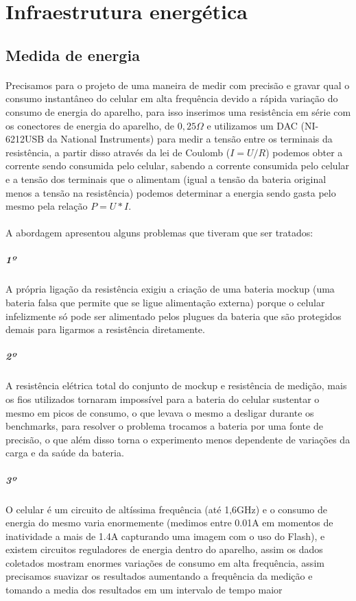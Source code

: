 \documentclass[11pt,a4paper,titlepage]{article}
\begin{document}
\section{Infraestrutura energética}
\subsection{Medida de energia} 
\paragraph{} Precisamos para o projeto de uma maneira de medir com precisão e gravar qual o consumo instantâneo do celular em alta frequência devido a rápida variação do consumo de energia do aparelho, para isso inserimos uma resistência em série com os conectores de energia do aparelho, de $0,25\Omega$ e utilizamos um DAC (NI-6212USB da National Instruments) para medir a tensão entre os terminais da resistência, a partir disso através da lei de Coulomb ($I=U/R$) podemos obter a corrente sendo consumida pelo celular, sabendo a corrente consumida pelo celular e a tensão dos terminais que o alimentam (igual a tensão da bateria original menos a tensão na resistência) podemos determinar a energia sendo gasta pelo mesmo pela relação $P=U*I$.
\paragraph{} A abordagem apresentou alguns problemas que tiveram que ser tratados:
\subparagraph*{1º} A própria ligação da resistência exigiu a criação de uma bateria mockup (uma bateria falsa que permite que se ligue alimentação externa) porque o celular infelizmente só pode ser alimentado pelos plugues da bateria que são protegidos demais para ligarmos a resistência diretamente.
\subparagraph*{2º} A resistência elétrica total do conjunto de mockup e resistência de medição, mais os fios utilizados tornaram impossível para a bateria do celular sustentar o mesmo em picos de consumo, o que levava o mesmo a desligar durante os benchmarks, para resolver o problema trocamos a bateria por uma fonte de precisão, o que além disso torna o experimento menos dependente de variações da carga e da saúde da bateria.
\subparagraph*{3º} O celular é um circuito de altíssima frequência (até 1,6GHz) e o consumo de energia do mesmo varia enormemente (medimos entre 0.01A em momentos de inatividade a mais de 1.4A capturando uma imagem com o uso do Flash), e existem circuitos reguladores de energia dentro do aparelho, assim os dados coletados mostram enormes variações de consumo em alta frequência, assim precisamos suavizar os resultados aumentando a frequência da medição e tomando a media dos resultados em um intervalo de tempo maior
\end{document}
